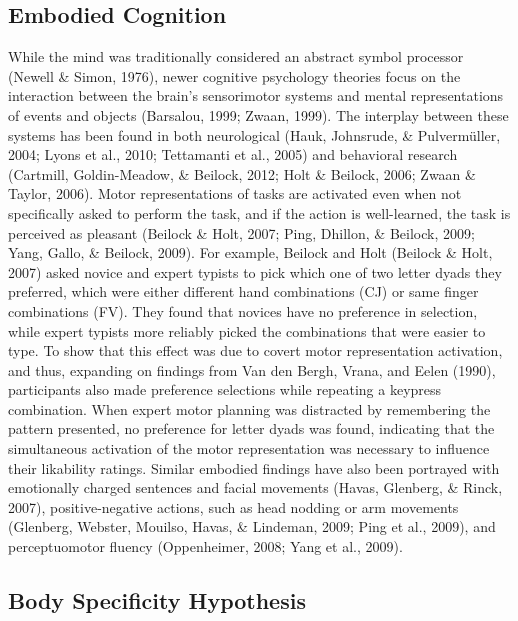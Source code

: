 \documentclass[english,man]{apa6}
\theoremstyle{definition}
\theoremstyle{definition}
\theoremstyle{definition}
\theoremstyle{remark}
\begin{document}
\subsection{Embodied Cognition}\label{embodied-cognition}

While the mind was traditionally considered an abstract symbol processor
(Newell \& Simon, 1976), newer cognitive psychology theories focus on
the interaction between the brain's sensorimotor systems and mental
representations of events and objects (Barsalou, 1999; Zwaan, 1999). The
interplay between these systems has been found in both neurological
(Hauk, Johnsrude, \& Pulvermüller, 2004; Lyons et al., 2010; Tettamanti
et al., 2005) and behavioral research (Cartmill, Goldin-Meadow, \&
Beilock, 2012; Holt \& Beilock, 2006; Zwaan \& Taylor, 2006). Motor
representations of tasks are activated even when not specifically asked
to perform the task, and if the action is well-learned, the task is
perceived as pleasant (Beilock \& Holt, 2007; Ping, Dhillon, \& Beilock,
2009; Yang, Gallo, \& Beilock, 2009). For example, Beilock and Holt
(Beilock \& Holt, 2007) asked novice and expert typists to pick which
one of two letter dyads they preferred, which were either different hand
combinations (CJ) or same finger combinations (FV). They found that
novices have no preference in selection, while expert typists more
reliably picked the combinations that were easier to type. To show that
this effect was due to covert motor representation activation, and thus,
expanding on findings from Van den Bergh, Vrana, and Eelen (1990),
participants also made preference selections while repeating a keypress
combination. When expert motor planning was distracted by remembering
the pattern presented, no preference for letter dyads was found,
indicating that the simultaneous activation of the motor representation
was necessary to influence their likability ratings. Similar embodied
findings have also been portrayed with emotionally charged sentences and
facial movements (Havas, Glenberg, \& Rinck, 2007), positive-negative
actions, such as head nodding or arm movements (Glenberg, Webster,
Mouilso, Havas, \& Lindeman, 2009; Ping et al., 2009), and
perceptuomotor fluency (Oppenheimer, 2008; Yang et al., 2009).

\subsection{Body Specificity
Hypothesis}\label{body-specificity-hypothesis}
\end{document}
